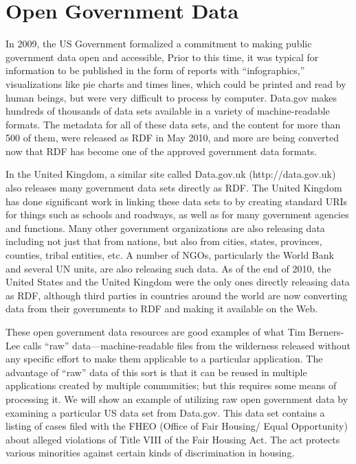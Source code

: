 \section{Open Government Data}

In 2009, the US Government formalized a commitment to making public
government data open and accessible, Prior to this time, it was typical
for information to be published in the form of reports with
``infographics,'' visualizations like pie charts and times lines, which
could be printed and read by human beings, but were very difficult to
process by computer. Data.gov makes hundreds of thousands of data sets
available in a variety of machine-readable formats. The metadata for all
of these data sets, and the content for more than 500 of them, were
released as RDF in May 2010, and more are being converted now that RDF
has become one of the approved government data formats.

In the United Kingdom, a similar site called Data.gov.uk
(http://data.gov.uk) also releases many government data sets directly as
RDF. The United Kingdom has done significant work in linking these data
sets to by creating standard URIs for things such as schools and
roadways, as well as for many government agencies and functions. Many
other government organizations are also releasing data including not
just that from nations, but also from cities, states, provinces,
counties, tribal entities, etc. A number of NGOs, particularly the World
Bank and several UN units, are also releasing such data. As of the end
of 2010, the United States and the United Kingdom were the only ones
directly releasing data as RDF, although third parties in countries
around the world are now converting data from their governments to RDF
and making it available on the Web.

These open government data resources are good examples of what Tim
Berners-Lee calls ``raw'' data---machine-readable files from the
wilderness released without any specific effort to make them applicable
to a particular application. The advantage of ``raw'' data of this sort
is that it can be reused in multiple applications created by multiple
communities; but this requires some means of processing it. We will show
an example of utilizing raw open government data by examining a
particular US data set from Data.gov. This data set contains a listing
of cases filed with the FHEO (Office of Fair Housing/ Equal Opportunity)
about alleged violations of Title VIII of the Fair Housing Act. The act
protects various minorities against certain kinds of discrimination in
housing.

